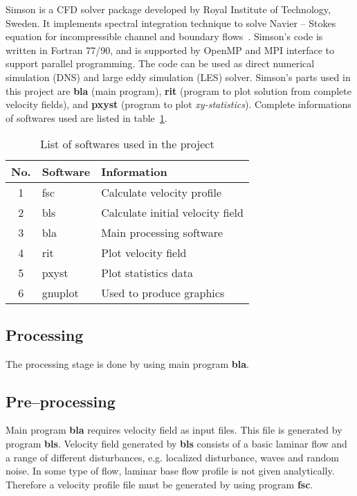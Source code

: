 Simson is a CFD solver package developed by Royal Institute of Technology, Sweden. It implements spectral integration technique to solve Navier -- Stokes equation for incompressible channel and boundary flows~\cite{Simson}. Simson's code is written in Fortran 77/90, and is supported by OpenMP and MPI interface to support parallel programming. The code can be used as direct numerical simulation (DNS) and large eddy simulation (LES) solver. Simson's parts used in this project are {\bf bla} (main program), {\bf rit} (program to plot solution from complete velocity fields), and {\bf pxyst} (program to plot \emph{xy-statistics}). Complete informations of softwares used are listed in table~\ref{tab:software}.
\begin{table}[h]
  \centering
  \begin{tabular}[h]{c l l}
    \hline\hline
    No. & Software & Information \\
    \hline
    1 & fsc & Calculate velocity profile \\
    2 & bls & Calculate initial velocity field \\
    3 & bla & Main processing software \\ 
    4 & rit & Plot velocity field \\ 
    5 & pxyst & Plot statistics data  \\ 
    6 & gnuplot & Used to produce graphics\\
    \hline
  \end{tabular}
  \caption{List of softwares used in the project}
  \label{tab:software}
\end{table}

 \subsection{Processing}
The processing stage is done by using main program {\bf bla}.
 
\subsection{Pre--processing}
 Main program {\bf bla} requires velocity field as input files. This file is generated by program {\bf bls}. Velocity field generated by {\bf bls} consists of a basic laminar flow and a range of different disturbances, e.g. localized disturbance, waves and random noise. In some type of flow, laminar base flow profile is not given analytically. Therefore a velocity profile file must be generated by using program {\bf fsc}.

